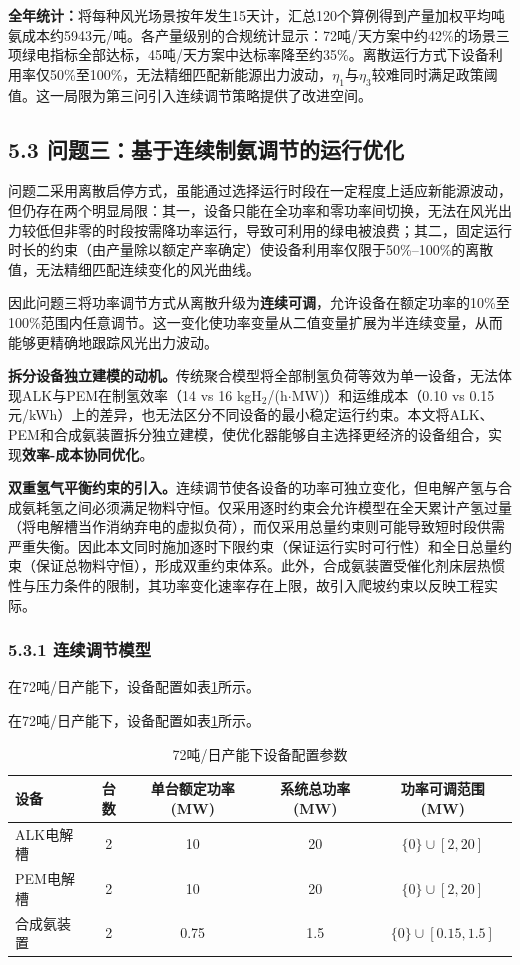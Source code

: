 \documentclass[zihao=-4,a4paper]{ctexart} %
\begin{document}
	\textbf{全年统计：}将每种风光场景按年发生15天计，汇总120个算例得到产量加权平均吨氨成本约5943元/吨。各产量级别的合规统计显示：72吨/天方案中约42\%的场景三项绿电指标全部达标，45吨/天方案中达标率降至约35\%。离散运行方式下设备利用率仅50\%至100\%，无法精细匹配新能源出力波动，$\eta_1$与$\eta_3$较难同时满足政策阈值。这一局限为第三问引入连续调节策略提供了改进空间。
	
	\subsection*{5.3 问题三：基于连续制氨调节的运行优化}
	
	问题二采用离散启停方式，虽能通过选择运行时段在一定程度上适应新能源波动，但仍存在两个明显局限：其一，设备只能在全功率和零功率间切换，无法在风光出力较低但非零的时段按需降功率运行，导致可利用的绿电被浪费；其二，固定运行时长的约束（由产量除以额定产率确定）使设备利用率仅限于50\%--100\%的离散值，无法精细匹配连续变化的风光曲线。
	
	因此问题三将功率调节方式从离散升级为\textbf{连续可调}，允许设备在额定功率的10\%至100\%范围内任意调节。这一变化使功率变量从二值变量扩展为半连续变量，从而能够更精确地跟踪风光出力波动。
	
	\textbf{拆分设备独立建模的动机。}传统聚合模型将全部制氢负荷等效为单一设备，无法体现ALK与PEM在制氢效率（14 vs 16 kgH$_2$/(h$\cdot$MW)）和运维成本（0.10 vs 0.15 元/kWh）上的差异，也无法区分不同设备的最小稳定运行约束。本文将ALK、PEM和合成氨装置拆分独立建模，使优化器能够自主选择更经济的设备组合，实现\textbf{效率-成本协同优化}。
	
	\textbf{双重氢气平衡约束的引入。}连续调节使各设备的功率可独立变化，但电解产氢与合成氨耗氢之间必须满足物料守恒。仅采用逐时约束会允许模型在全天累计产氢过量（将电解槽当作消纳弃电的虚拟负荷），而仅采用总量约束则可能导致短时段供需严重失衡。因此本文同时施加逐时下限约束（保证运行实时可行性）和全日总量约束（保证总物料守恒），形成双重约束体系。此外，合成氨装置受催化剂床层热惯性与压力条件的限制，其功率变化速率存在上限，故引入爬坡约束以反映工程实际。
	
	\subsubsection*{5.3.1 连续调节模型}
	
	在72吨/日产能下，设备配置如表\ref{tab:q3_devices}所示。
	
	在72吨/日产能下，设备配置如表\ref{tab:q3_devices}所示。
	
	\begin{table}[ht]
		\centering
		\caption{72吨/日产能下设备配置参数}
		\label{tab:q3_devices}
		\begin{tabular}{lcccc}
			\toprule
			设备 & 台数 & 单台额定功率(MW) & 系统总功率(MW) & 功率可调范围(MW)\\
			\midrule
			ALK电解槽 & 2 & 10 & 20 & $\{0\}\cup[2,20]$ \\
			PEM电解槽 & 2 & 10 & 20 & $\{0\}\cup[2,20]$ \\
			合成氨装置 & 2 & 0.75 & 1.5 & $\{0\}\cup[0.15,1.5]$ \\
			\bottomrule
		\end{tabular}
	\end{table}
	
\end{document}
